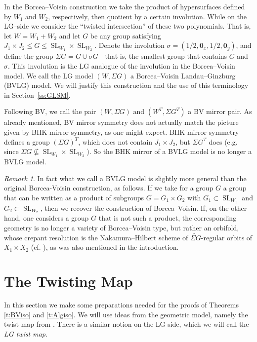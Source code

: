 \documentclass[10pt, letterpaper]{amsart}
\theoremstyle{remark}
\newtheorem{rem}{Remark}[thm]
\newcommand{\s}[1]{\Sigma #1}
\newcommand{\mb}[1]{\mathbf{#1}}
\DeclareMathOperator{\SL}{SL}
\newcommand{\amandain}[1]{\todo[bordercolor=red(munsell),backgroundcolor=eggshell, author=Am, inline]{#1}}
\begin{document}
In the Borcea--Voisin construction we take the product of hypersurfaces defined by $W_1$ and $W_2$, respectively,  then quotient by a certain involution. While on the LG--side we consider the ``twisted intersection'' of these two polynomials. That is, let $W=W_1+W_2$ and let $G$ be any group satisfying $J_1\times J_2\leq G\leq \SL_{W_1}\times \SL_{W_2}$. Denote the involution 
$\sigma=(1/2,\mb{0}_x,1/2,\mb{0}_y)$, and define the group $\s{G}=G\cup \sigma G$---that is, the smallest group that contains $G$ and $\sigma$. This involution is the LG analogue of the involution in the Borcea--Voisin model. We call the LG model $(W,\s{G})$ a Borcea--Voisin Landau--Ginzburg (BVLG) model. We will justify this construction and the use of this terminology in Section~\ref{ss:GLSM}. 

Following BV, we call the pair $(W,\s{G})$ and $(W^T,\s{G^T})$ a BV mirror pair. %
As already mentioned, BV mirror symmetry does not actually match the picture given by BHK mirror symmetry, as one might expect. 
BHK mirror symmetry defines a group $(\s{G})^T$, which does not contain $J_1\times J_2$, but $\s G^T$ does (e.g. since $\s{G}\nsubseteq \SL_{W_1}\times \SL_{W_2}$). So the BHK mirror of a BVLG model is no longer a BVLG model.


\begin{rem}
In fact what we call a BVLG model is slightly more general than the original Borcea-Voisin construction, as follows. If we take for a group $G$ a group that can be written as a product of subgroups $G=G_1\times G_2$ with $G_1\subset \SL_{W_1}$ and $ G_2\subset \SL_{W_2}$, then we recover the construction of Borcea--Voisin. If, on the other hand, one considers a group $G$ that is not such a product, the corresponding geometry is no longer a variety of Borcea--Voisin type, but rather an orbifold, whose crepant resolution is the Nakamura--Hilbert scheme of $\widetilde{\s G}$-regular orbits of $X_1\times X_2$ (cf. \cite{Na}), as was also mentioned in the introduction.  
\end{rem} %







\section{The Twisting Map}\label{sec:twist}
In this section we make some preparations needed for the proofs of Theorems \ref{t:BViso} and \ref{t:Algiso}. We will use ideas from the geometric model, namely the twist map from \cite{Borcea}. There is a similar notion on the LG side, which we will call the \emph{LG twist map}. 
\end{document}
